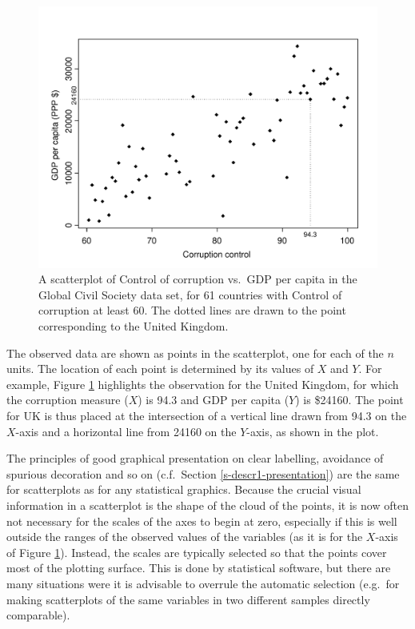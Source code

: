 \documentclass[11pt,a4paper,openany]{book}
\begin{document}
\begin{figure}[htbp]
\centering
\includegraphics[width=14.00000cm]{corruption1.pdf}
\caption{\label{fig:f-corruption1} A scatterplot of Control of corruption
vs.~GDP per capita in the Global Civil Society data set, for 61
countries with Control of corruption at least 60. The dotted lines are
drawn to the point corresponding to the United Kingdom.}
\end{figure}

The observed data are shown as points in the scatterplot, one for each
of the \(n\) units. The location of each point is determined by its
values of \(X\) and \(Y\). For example, Figure \ref{fig:f-corruption1}
highlights the observation for the United Kingdom, for which the
corruption measure (\(X\)) is 94.3 and GDP per capita (\(Y\)) is
\$24160. The point for UK is thus placed at the intersection of a
vertical line drawn from 94.3 on the \(X\)-axis and a horizontal line
from 24160 on the \(Y\)-axis, as shown in the plot.

The principles of good graphical presentation on clear labelling,
avoidance of spurious decoration and so on (c.f.~Section
\ref{s-descr1-presentation}) are the same for scatterplots as for any
statistical graphics. Because the crucial visual information in a
scatterplot is the shape of the cloud of the points, it is now often not
necessary for the scales of the axes to begin at zero, especially if
this is well outside the ranges of the observed values of the variables
(as it is for the \(X\)-axis of Figure \ref{fig:f-corruption1}).
Instead, the scales are typically selected so that the points cover most
of the plotting surface. This is done by statistical software, but there
are many situations were it is advisable to overrule the automatic
selection (e.g.~for making scatterplots of the same variables in two
different samples directly comparable).
\end{document}
